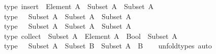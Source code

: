 \begin{isabellebody}
\ \ {\isacharbrackleft}{\kern0pt}type{\isacharbrackright}{\kern0pt}{\isacharcolon}{\kern0pt}\ {\isachardoublequoteopen}insert\ {\isacharcolon}{\kern0pt}\ Element\ A\ {\isasymRightarrow}\ Subset\ A\ {\isasymRightarrow}\ Subset\ A{\isachardoublequoteclose}\ \isanewline
\isanewline
\ \ {\isacharbrackleft}{\kern0pt}type{\isacharbrackright}{\kern0pt}{\isacharcolon}{\kern0pt}\ {\isachardoublequoteopen}{\isacharparenleft}{\kern0pt}{\isasymunion}{\isacharparenright}{\kern0pt}\ {\isacharcolon}{\kern0pt}\ Subset\ A\ {\isasymRightarrow}\ Subset\ A\ {\isasymRightarrow}\ Subset\ A{\isachardoublequoteclose}\ \isanewline
\ \ {\isacharbrackleft}{\kern0pt}type{\isacharbrackright}{\kern0pt}{\isacharcolon}{\kern0pt}\ {\isachardoublequoteopen}{\isacharparenleft}{\kern0pt}{\isasyminter}{\isacharparenright}{\kern0pt}\ {\isacharcolon}{\kern0pt}\ Subset\ A\ {\isasymRightarrow}\ Subset\ A\ {\isasymRightarrow}\ Subset\ A{\isachardoublequoteclose}\ \isanewline
\ \ {\isacharbrackleft}{\kern0pt}type{\isacharbrackright}{\kern0pt}{\isacharcolon}{\kern0pt}\ {\isachardoublequoteopen}collect\ {\isacharcolon}{\kern0pt}\ Subset\ A\ {\isasymRightarrow}\ {\isacharparenleft}{\kern0pt}Element\ A\ {\isasymRightarrow}\ Bool{\isacharparenright}{\kern0pt}\ {\isasymRightarrow}\ Subset\ A{\isachardoublequoteclose}\ \isanewline
\ \ {\isacharbrackleft}{\kern0pt}type{\isacharbrackright}{\kern0pt}{\isacharcolon}{\kern0pt}\ {\isachardoublequoteopen}{\isacharparenleft}{\kern0pt}{\isasymtimes}{\isacharparenright}{\kern0pt}\ {\isacharcolon}{\kern0pt}\ Subset\ A\ {\isasymRightarrow}\ Subset\ B\ {\isasymRightarrow}\ Subset\ {\isacharparenleft}{\kern0pt}A\ {\isasymtimes}\ B{\isacharparenright}{\kern0pt}{\isachardoublequoteclose}\isanewline
%
\isadelimproof
\ \ %
\endisadelimproof
%
\isatagproof
{}\isamarkupfalse%
\ unfold{\isacharunderscore}{\kern0pt}types\ auto%
\endisatagproof
{\isafoldproof}%
%
\isadelimproof
\isanewline
%
\endisadelimproof
\isanewline
%
\isadelimtheory
\isanewline
%
\endisadelimtheory
%
\isatagtheory
{}\isamarkupfalse%
%
\endisatagtheory
{\isafoldtheory}%
%
\isadelimtheory
%
\endisadelimtheory
%
\end{isabellebody}%
\endinput
